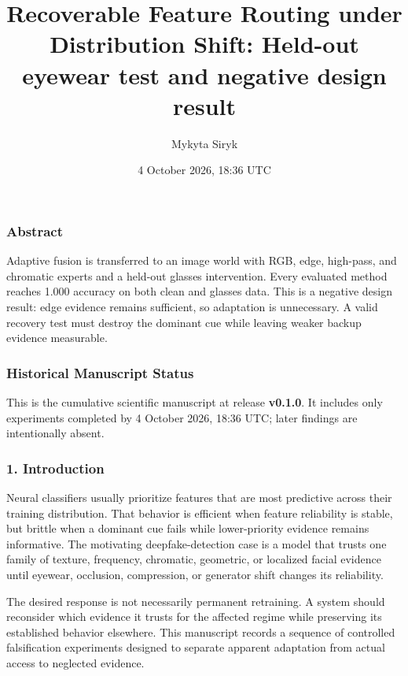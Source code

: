 \documentclass[
  10pt,
]{article}
\title{Recoverable Feature Routing under Distribution Shift: Held-out
eyewear test and negative design result}
\author{Mykyta Siryk}
\date{4 October 2026, 18:36 UTC}
\begin{document}
\maketitle

\hypertarget{abstract}{%
\subsubsection{Abstract}\label{abstract}}

Adaptive fusion is transferred to an image world with RGB, edge,
high-pass, and chromatic experts and a held-out glasses intervention.
Every evaluated method reaches 1.000 accuracy on both clean and glasses
data. This is a negative design result: edge evidence remains
sufficient, so adaptation is unnecessary. A valid recovery test must
destroy the dominant cue while leaving weaker backup evidence
measurable.

\hypertarget{historical-manuscript-status}{%
\subsubsection{Historical Manuscript
Status}\label{historical-manuscript-status}}

This is the cumulative scientific manuscript at release \textbf{v0.1.0}.
It includes only experiments completed by 4 October 2026, 18:36 UTC;
later findings are intentionally absent.

\hypertarget{introduction}{%
\subsubsection{1. Introduction}\label{introduction}}

Neural classifiers usually prioritize features that are most predictive
across their training distribution. That behavior is efficient when
feature reliability is stable, but brittle when a dominant cue fails
while lower-priority evidence remains informative. The motivating
deepfake-detection case is a model that trusts one family of texture,
frequency, chromatic, geometric, or localized facial evidence until
eyewear, occlusion, compression, or generator shift changes its
reliability.

The desired response is not necessarily permanent retraining. A system
should reconsider which evidence it trusts for the affected regime while
preserving its established behavior elsewhere. This manuscript records a
sequence of controlled falsification experiments designed to separate
apparent adaptation from actual access to neglected evidence.
\end{document}
